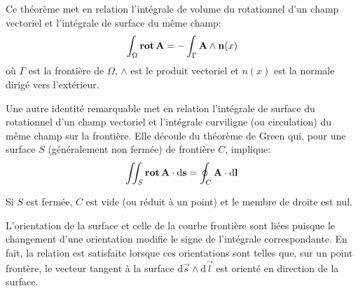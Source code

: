 \ifVersionDuDocEstVincent\medskip\fi
\begin{theoreme}

Ce théorème met en relation l'intégrale de volume du rotationnel d'un champ vectoriel et l'intégrale
de surface du même champ:
\begin{equation}
\int_\Omega \operatorname{\mathbf{rot}}  {\mathbf{A}} =
-\int_\Gamma {\mathbf{A} } \wedge \mathbf{n}(x)
\end{equation}
où $\Gamma$ est la frontière de $\Omega$, $\wedge$ est le produit vectoriel et $n(x)$ est
la normale dirigé vers l'extérieur.
\end{theoreme}

\ifVersionDuDocEstVincent\medskip\fi{}
Une autre identité remarquable met en relation l'intégrale de surface du rotationnel d'un champ vectoriel
et l'intégrale curviligne (ou circulation) du même champ sur la frontière.
Elle découle du théorème de Green qui, pour une surface $S$ (généralement non fermée) de
frontière $C$, implique:
\begin{equation}
\iint_S \operatorname{\mathbf{rot}}  {\mathbf{A}} \cdot \mathrm d\mathbf{s} = \oint_C {\mathbf{A}} \cdot \mathrm d \mathbf{l}
\end{equation}

Si $S$ est fermée, $C$ est vide (ou réduit à un point) et le membre de droite est nul.

\ifVersionDuDocEstVincent\medskip\fi
L'orientation de la surface et celle de la courbe frontière sont liées puisque le changement
d'une orientation modifie le signe de l'intégrale correspondante.
En fait, la relation est satisfaite lorsque ces orientations sont telles que, sur un point frontère,
le vecteur tangent à la surface $\mathrm d \vec s \wedge \mathrm d \vec l$ est orienté
en direction de la surface.


